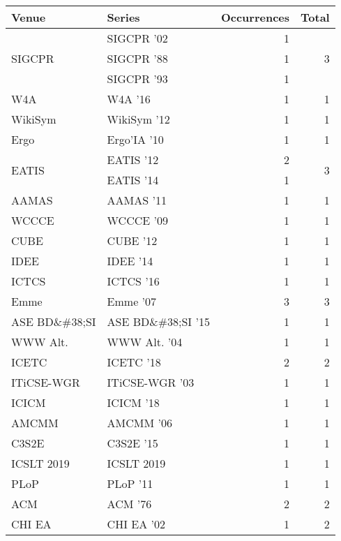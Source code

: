 \begin{table*}[t]
\begin{tabular}{llrr}
Venue & Series & Occurrences & Total\\\hline
\multirow{3}{*}{SIGCPR } & SIGCPR '02 & 1 & \multirow{3}{*}{3}\\
& SIGCPR '88 & 1 &\\
& SIGCPR '93 & 1 &\\
\multirow{1}{*}{W4A } & W4A '16 & 1 & \multirow{1}{*}{1}\\
\multirow{1}{*}{WikiSym } & WikiSym '12 & 1 & \multirow{1}{*}{1}\\
\multirow{1}{*}{Ergo} & Ergo'IA '10 & 1 & \multirow{1}{*}{1}\\
\multirow{2}{*}{EATIS } & EATIS '12 & 2 & \multirow{2}{*}{3}\\
& EATIS '14 & 1 &\\
\multirow{1}{*}{AAMAS } & AAMAS '11 & 1 & \multirow{1}{*}{1}\\
\multirow{1}{*}{WCCCE } & WCCCE '09 & 1 & \multirow{1}{*}{1}\\
\multirow{1}{*}{CUBE } & CUBE '12 & 1 & \multirow{1}{*}{1}\\
\multirow{1}{*}{IDEE } & IDEE '14 & 1 & \multirow{1}{*}{1}\\
\multirow{1}{*}{ICTCS } & ICTCS '16 & 1 & \multirow{1}{*}{1}\\
\multirow{1}{*}{Emme } & Emme '07 & 3 & \multirow{1}{*}{3}\\
\multirow{1}{*}{ASE BD\&\#38;SI } & ASE BD\&\#38;SI '15 & 1 & \multirow{1}{*}{1}\\
\multirow{1}{*}{WWW Alt. } & WWW Alt. '04 & 1 & \multirow{1}{*}{1}\\
\multirow{1}{*}{ICETC } & ICETC '18 & 2 & \multirow{1}{*}{2}\\
\multirow{1}{*}{ITiCSE-WGR } & ITiCSE-WGR '03 & 1 & \multirow{1}{*}{1}\\
\multirow{1}{*}{ICICM } & ICICM '18 & 1 & \multirow{1}{*}{1}\\
\multirow{1}{*}{AMCMM } & AMCMM '06 & 1 & \multirow{1}{*}{1}\\
\multirow{1}{*}{C3S2E } & C3S2E '15 & 1 & \multirow{1}{*}{1}\\
\multirow{1}{*}{ICSLT 2019} & ICSLT 2019 & 1 & \multirow{1}{*}{1}\\
\multirow{1}{*}{PLoP } & PLoP '11 & 1 & \multirow{1}{*}{1}\\
\multirow{1}{*}{ACM } & ACM '76 & 2 & \multirow{1}{*}{2}\\
\multirow{2}{*}{CHI EA } & CHI EA '02 & 1 & \multirow{2}{*}{2}\\

\end{tabular}
\end{table*}
